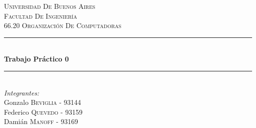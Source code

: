 \documentclass{article}
\begin{document}
\begin{titlepage}

\newcommand{\HRule}{\rule{\linewidth}{0.5mm}} %

\center %
 

\textsc{\LARGE Universidad De Buenos Aires}\\[1.5cm] %
\textsc{\Large Facultad De Ingeniería}\\[0.5cm] %
\textsc{\large 66.20 Organización De Computadoras}\\[0.5cm] %


\HRule \\[0.4cm]
{ \huge \bfseries Trabajo Práctico 0}\\[0.4cm] %
\HRule \\[1.5cm]
 

\Large \emph{Integrantes:}\\
Gonzalo \textsc{Beviglia} - 93144\\ %
Federico \textsc{Quevedo} - 93159\\ %
Damián \textsc{Manoff} - 93169\\[5cm] %



\end{titlepage}
\end{document}

